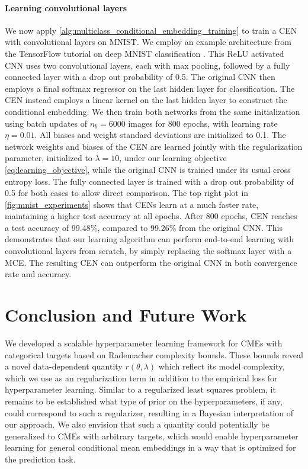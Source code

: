 \documentclass[twoside]{article}
\begin{document}
	\paragraph{Learning convolutional layers}
	
		We now apply \cref{alg:multiclass_conditional_embedding_training} to train a \gls{CEN} with convolutional layers on MNIST. We employ an example architecture from the TensorFlow tutorial on deep MNIST classification \citep{abadi2016tensorflow}. This ReLU activated \gls{CNN} uses two convolutional layers, each with max pooling, followed by a fully connected layer with a drop out probability of 0.5. The original \gls{CNN} then employs a final softmax regressor on the last hidden layer for classification. The \gls{CEN} instead employs a linear kernel on the last hidden layer to construct the conditional embedding. We then train both networks from the same initialization using batch updates of $n_{b} = 6000$ images for 800 epochs, with learning rate $\eta = 0.01$. All biases and weight standard deviations are initialized to 0.1. The network weights and biases of the \gls{CEN} are learned jointly with the regularization parameter, initialized to $\lambda = 10$, under our learning objective \eqref{eq:learning_objective}, while the original \gls{CNN} is trained under its usual cross entropy loss. The fully connected layer is trained with a drop out probability of 0.5 for both cases to allow direct comparison. The top right plot in \cref{fig:mnist_experiments} shows that \glspl{CEN} learn at a much faster rate, maintaining a higher test accuracy at all epochs. After 800 epochs, \gls{CEN} reaches a test accuracy of 99.48\%, compared to 99.26\% from the original \gls{CNN}. This demonstrates that our learning algorithm can perform end-to-end learning with convolutional layers from scratch, by simply replacing the softmax layer with a \gls{MCE}. The resulting \gls{CEN} can outperform the original \gls{CNN} in both convergence rate and accuracy.
	
	\section{Conclusion and Future Work}
	
		We developed a scalable hyperparameter learning framework for \glspl{CME} with categorical targets based on Rademacher complexity bounds. These bounds reveal a novel data-dependent quantity $r(\theta, \lambda)$ which reflect its model complexity, which we use as an regularization term in addition to the empirical loss for hyperparameter learning. Similar to a regularized least squares problem, it remains to be established what type of prior on the hyperparameters, if any, could correspond to such a regularizer, resulting in a Bayesian interpretation of our approach. We also envision that such a quantity could potentially be generalized to \glspl{CME} with arbitrary targets, which would enable hyperparameter learning for general conditional mean embeddings in a way that is optimized for the prediction task.
		
\end{document}
